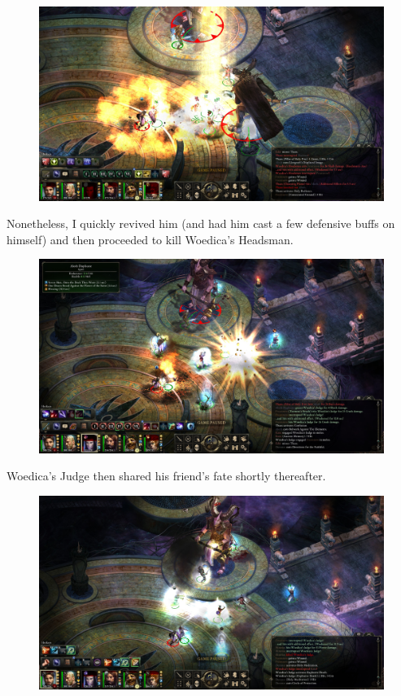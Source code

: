 \documentclass{article}
\begin{document}
\begin{figure}
\includegraphics[scale=0.33]{files/blog/2019_03_17_pillars_of_eternity_path_of_the_damned_act_iv/2019_03_17_thaos1.jpg}
\end{figure}

Nonetheless, I quickly revived him (and had him cast a few defensive buffs on himself) and then proceeded to kill Woedica's Headsman.

\begin{figure}
\includegraphics[scale=0.33]{files/blog/2019_03_17_pillars_of_eternity_path_of_the_damned_act_iv/2019_03_17_thaos2.jpg}
\end{figure}

Woedica's Judge then shared his friend's fate shortly thereafter.

\begin{figure}
\includegraphics[scale=0.33]{files/blog/2019_03_17_pillars_of_eternity_path_of_the_damned_act_iv/2019_03_17_thaos3.jpg}
\end{figure}
\end{document}
